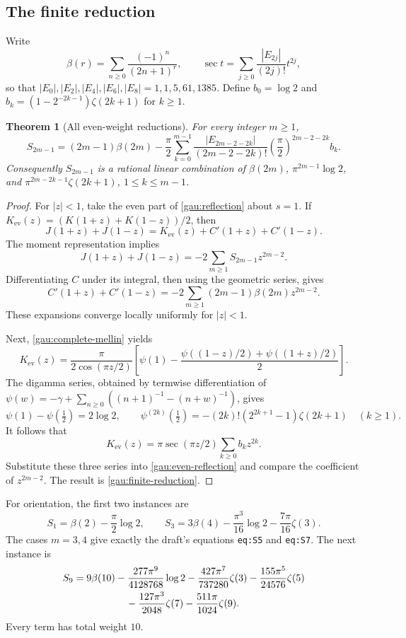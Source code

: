 \documentclass[11pt,a4paper]{article}
\newtheorem{theorem}{Theorem}[section]
\theoremstyle{definition}
\theoremstyle{remark}
\numberwithin{equation}{section}
\begin{document}
\subsection{The finite reduction}

Write
\[
 \beta(r)=\sum_{n\geq0}\frac{(-1)^n}{(2n+1)^r},
 \qquad
 \sec t=\sum_{j\geq0}\frac{|E_{2j}|}{(2j)!}t^{2j},
\]
so that $|E_0|,|E_2|,|E_4|,|E_6|,|E_8|=1,1,5,61,1385$.
Define $b_0=\log2$ and
$b_k=(1-2^{-2k-1})\zeta(2k+1)$ for $k\geq1$.

\begin{theorem}[All even-weight reductions]\label{gau:all-weights}
For every integer $m\geq1$,
\begin{equation}\label{gau:finite-reduction}
 \boxed{\displaystyle
 S_{2m-1}=(2m-1)\beta(2m)
 -\frac\pi2\sum_{k=0}^{m-1}
 \frac{|E_{2m-2-2k}|}{(2m-2-2k)!}
       \left(\frac\pi2\right)^{2m-2-2k}b_k.}
\end{equation}
Consequently $S_{2m-1}$ is a rational linear combination of
$\beta(2m)$, $\pi^{2m-1}\log2$, and
$\pi^{2m-2k-1}\zeta(2k+1)$, $1\leq k\leq m-1$.
\end{theorem}
\begin{proof}
For $|z|<1$, take the even part of \eqref{gau:reflection} about $s=1$.
If $K_{\mathrm{ev}}(z)=(K(1+z)+K(1-z))/2$, then
\begin{equation}\label{gau:even-reflection}
 J(1+z)+J(1-z)
 =K_{\mathrm{ev}}(z)+C'(1+z)+C'(1-z).
\end{equation}
The moment representation implies
\[
 J(1+z)+J(1-z)=-2\sum_{m\geq1}S_{2m-1}z^{2m-2}.
\]
Differentiating $C$ under its integral, then using the geometric series,
gives
\[
 C'(1+z)+C'(1-z)
 =-2\sum_{m\geq1}(2m-1)\beta(2m)z^{2m-2}.
\]
These expansions converge locally uniformly for $|z|<1$.

Next, \eqref{gau:complete-mellin} yields
\[
 K_{\mathrm{ev}}(z)=\frac\pi{2\cos(\pi z/2)}
 \left[\psi(1)-\frac{\psi((1-z)/2)+\psi((1+z)/2)}2\right].
\]
The digamma series, obtained by termwise differentiation of
$\psi(w)=-\gamma+\sum_{n\geq0}((n+1)^{-1}-(n+w)^{-1})$, gives
\[
 \psi(1)-\psi(\tfrac12)=2\log2,
 \qquad
 \psi^{(2k)}(\tfrac12)=-(2k)!(2^{2k+1}-1)\zeta(2k+1)
 \quad(k\geq1).
\]
It follows that
\[
 K_{\mathrm{ev}}(z)
 =\pi\sec(\pi z/2)\sum_{k\geq0}b_k z^{2k}.
\]
Substitute these three series into \eqref{gau:even-reflection} and compare
the coefficient of $z^{2m-2}$. The result is
\eqref{gau:finite-reduction}.
\end{proof}

For orientation, the first two instances are
\[
 S_1=\beta(2)-\frac\pi2\log2,
 \qquad
 S_3=3\beta(4)-\frac{\pi^3}{16}\log2
                     -\frac{7\pi}{16}\zeta(3).
\]
The cases $m=3,4$ give exactly the draft's equations
\texttt{eq:S5} and \texttt{eq:S7}. The next instance is
\begin{align}\label{gau:s9}
 S_9={}&9\beta(10)-\frac{277\pi^9}{4128768}\log2
       -\frac{427\pi^7}{737280}\zeta(3)
       -\frac{155\pi^5}{24576}\zeta(5)\nonumber\\
     &\hspace{14mm}-\frac{127\pi^3}{2048}\zeta(7)
       -\frac{511\pi}{1024}\zeta(9).
\end{align}
Every term has total weight $10$.
\end{document}
